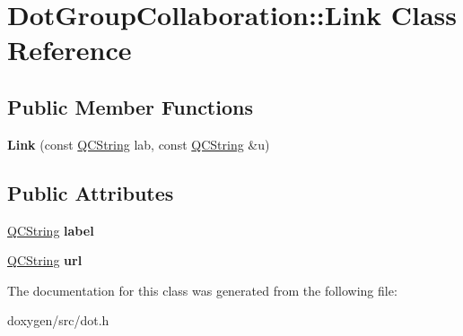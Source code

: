 \hypertarget{class_dot_group_collaboration_1_1_link}{}\section{Dot\+Group\+Collaboration\+::Link Class Reference}
\label{class_dot_group_collaboration_1_1_link}
\subsection*{Public Member Functions}
\begin{DoxyCompactItemize}
\item 
\mbox{\label{class_dot_group_collaboration_1_1_link_a66ad87ee78b2a642ff26d95c22148bc1}} 
{\bfseries Link} (const \mbox{\hyperlink{class_q_c_string}{Q\+C\+String}} lab, const \mbox{\hyperlink{class_q_c_string}{Q\+C\+String}} \&u)
\end{DoxyCompactItemize}
\subsection*{Public Attributes}
\begin{DoxyCompactItemize}
\item 
\mbox{\label{class_dot_group_collaboration_1_1_link_aaea36ab56bf3845f2f60805a434b3262}} 
\mbox{\hyperlink{class_q_c_string}{Q\+C\+String}} {\bfseries label}
\item 
\mbox{\label{class_dot_group_collaboration_1_1_link_a73dde739c55a41c9fd8cd2786dcc4f28}} 
\mbox{\hyperlink{class_q_c_string}{Q\+C\+String}} {\bfseries url}
\end{DoxyCompactItemize}


The documentation for this class was generated from the following file\+:\begin{DoxyCompactItemize}
\item 
doxygen/src/dot.\+h\end{DoxyCompactItemize}
